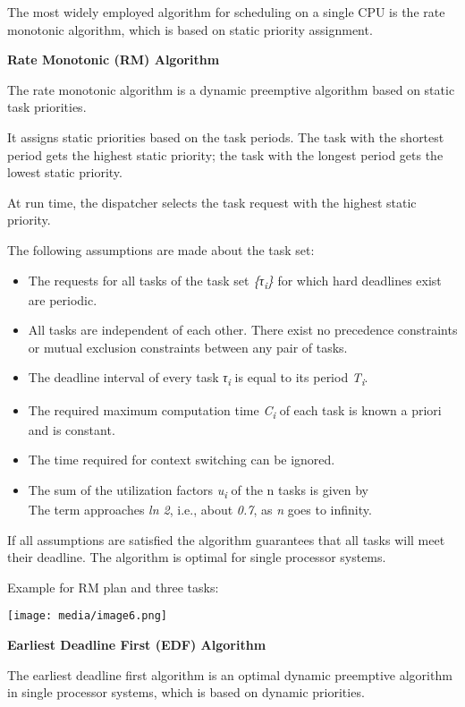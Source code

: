 The most widely employed algorithm for scheduling on a single CPU is the
rate monotonic algorithm, which is based on static priority assignment.

\textbf{Rate Monotonic (RM) Algorithm}

The rate monotonic algorithm is a dynamic preemptive algorithm based on
static task priorities.

It assigns static priorities based on the task periods. The task with
the shortest period gets the highest static priority; the task with the
longest period gets the lowest static priority.

At run time, the dispatcher selects the task request with the highest
static priority.

The following assumptions are made about the task set:

\begin{itemize}
\item
  The requests for all tasks of the task set
  \emph{\{τ\textsubscript{i}\}} for which hard deadlines exist are
  periodic.
\item
  All tasks are independent of each other. There exist no precedence
  constraints or mutual exclusion constraints between any pair of tasks.
\item
  The deadline interval of every task \emph{τ\textsubscript{i}} is equal
  to its period \emph{T\textsubscript{i}}.
\item
  The required maximum computation time \emph{C\textsubscript{i}} of
  each task is known a priori and is constant.
\item
  The time required for context switching can be ignored.
\item
  The sum of the utilization factors \emph{u\textsubscript{i}} of the n
  tasks is given by\\
  The term approaches \emph{ln 2}, i.e., about \emph{0.7}, as \emph{n}
  goes to infinity.
\end{itemize}

If all assumptions are satisfied the algorithm guarantees that all tasks
will meet their deadline. The algorithm is optimal for single processor
systems.

Example for RM plan and three tasks:

\texttt{[image: media/image6.png]}

\textbf{Earliest Deadline First (EDF) Algorithm}

The earliest deadline first algorithm is an optimal dynamic preemptive
algorithm in single processor systems, which is based on dynamic
priorities.

